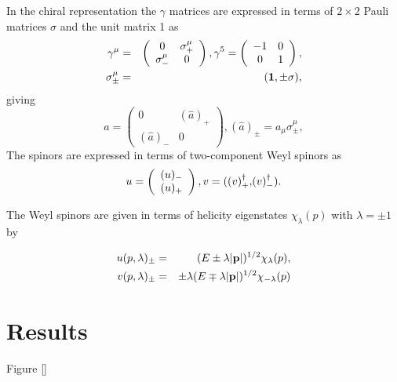 \documentclass[manuscript]{../aastex52/aastex}
\newcommand{\vdag}{(v)^\dagger}
\begin{document}
In the chiral  representation the $\gamma$ matrices are expressed
in terms of $2\times 2$ Pauli matrices $\sigma$ and the unit matrix 1 as
\begin{eqnarray}
\gamma^\mu  & = &
 \left(
\begin{array}{cc}
0 & \sigma^\mu_+ \\
\sigma^\mu_- & 0
\end{array}     \right) ,
 \gamma^5= \left(
\begin{array}{cc}
-1 &   0\\
0 &   1
\end{array}     \right)  , \nonumber \\
\sigma^\mu_{\pm}  & = &   ({\bf 1} ,\pm \sigma) , \nonumber
\end{eqnarray}
giving
\begin{equation}
\hat a= \left(
\begin{array}{cc}
0 & (\hat a)_+\\
(\hat a)_- & 0
\end{array}\right), (\hat a)_\pm=a_\mu\sigma^\mu_\pm ,
\end{equation}
The spinors are expressed in terms of two-component Weyl spinors as
\begin{equation}
u=\left(
\begin{array}{c}
(u)_-\\
(u)_+
\end{array}\right), v={\bf (}\vdag_+{\bf ,}   \vdag_-{\bf )} .
\end{equation}


The Weyl spinors are given in terms of helicity eigenstates
$\chi_\lambda(p)$ with $\lambda=\pm1$ by
\begin{mathletters}
\begin{eqnarray}
u(p,\lambda)_\pm & = & (E\pm\lambda|{\bf p}|)^{1/2}\chi_\lambda(p) , \\
v(p,\lambda)_\pm & = & \pm\lambda(E\mp\lambda|{\bf p}|)^{1/2}\chi
_{-\lambda}(p)
\end{eqnarray}
\end{mathletters}


\section{Results}
\label{sec:results}
Figure \ref{}
\end{document}
